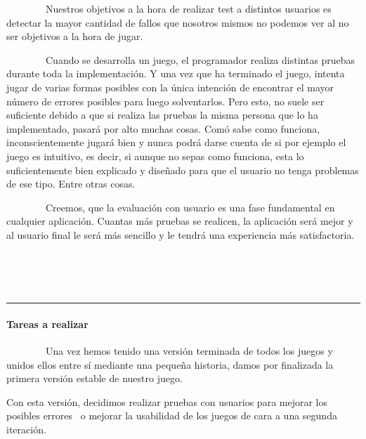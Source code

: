 \documentclass[]{article}
\begin{document}
~~~~~~~~Nuestros objetivos a la hora de realizar test a distintos
usuarios es detectar la mayor cantidad de fallos que nosotros mismos no
podemos ver al no ser objetivos a la hora de jugar.

~~~~~~~~Cuando se desarrolla un juego, el programador realiza distintas
pruebas durante toda la implementación. Y una vez que ha terminado el
juego, intenta jugar de varias formas posibles con la única intención de
encontrar el mayor número de errores posibles para luego solventarlos.
Pero esto, no suele ser suficiente debido a que si realiza las pruebas
la misma persona que lo ha implementado, pasará por alto muchas cosas.
Comó sabe como funciona, inconscientemente jugará bien y nunca podrá
darse cuenta de si por ejemplo el juego es intuitivo, es decir, si
aunque no sepas como funciona, esta lo suficientemente bien explicado y
diseñado para que el usuario no tenga problemas de ese tipo. Entre otras
cosas.

~~~~~~~~Creemos, que la evaluación con usuario es una fase fundamental
en cualquier aplicación. Cuantas más pruebas se realicen, la aplicación
será mejor y al usuario final le será más sencillo y le tendrá una
experiencia más satisfactoria.

~~~~~~~~

~

\paragraph{}\label{h.6ypf9b5yyx1}

\begin{center}\rule{3in}{0.4pt}\end{center}

\paragraph{}\label{h.cy4d1kd5brdq}

\paragraph{Tareas a realizar}\label{h.9dug8ado9iqg}

~~~~~~~~Una vez hemos tenido una versión terminada de todos los juegos y
unidos ellos entre sí mediante una pequeña historia, damos por
finalizada la primera versión estable de nuestro juego.

Con esta versión, decidimos realizar pruebas con usuarios para mejorar
los posibles errores ~o mejorar la usabilidad de los juegos de cara a
una segunda iteración.
\end{document}
